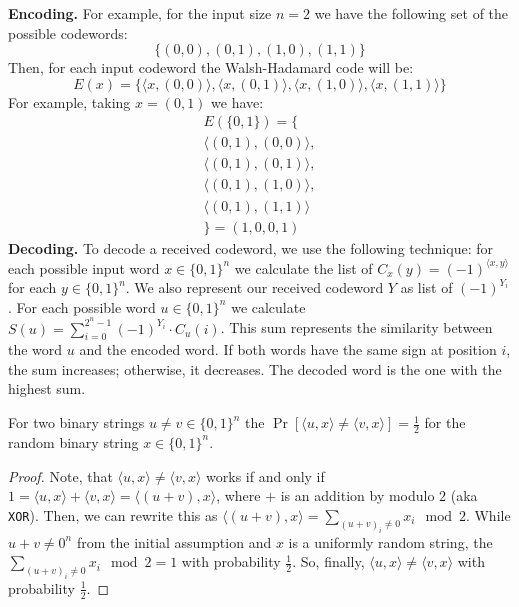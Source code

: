 \documentclass[../lecture-notes.tex]{subfiles}
\begin{document}
\begin{example}
\textbf{Encoding.} For example, for the input size $n = 2$ we have the following set of the possible codewords:
\begin{equation*}
    \{(0, 0), (0, 1), (1, 0), (1, 1)\}
\end{equation*}
Then, for each input codeword the Walsh-Hadamard code will be:
\begin{equation*}
    E(x) = \{\langle x, (0, 0) \rangle, \langle x, (0, 1) \rangle, \langle x, (1, 0) \rangle, \langle x,  (1, 1) \rangle\}
\end{equation*}
For example, taking $x = (0, 1)$ we have:
\begin{gather*}
    E(\{0, 1\}) = \{\\
    \langle (0, 1), (0, 0) \rangle,\\
    \langle (0, 1), (0, 1) \rangle,\\
    \langle (0, 1), (1, 0) \rangle,\\
    \langle (0, 1), (1, 1) \rangle\\
    \}=(1, 0, 0, 1)
\end{gather*}
\textbf{Decoding.} To decode a received codeword, we use the following technique: for each possible input word 
$x \in \{0, 1\}^n$ we calculate the list of $C_x(y) = (-1)^{\langle x, y \rangle}$ for each $y \in \{0, 1\}^n$. We 
also represent our received codeword $Y$ as list of $(-1)^{Y_i}$. For each possible word $u \in \{0, 1\}^n$ we 
calculate $S(u) = \sum_{i=0}^{2^n - 1} (-1)^{Y_i} \cdot C_u(i)$. This sum represents the similarity between the word 
$u$ and the encoded word. If both words have the same sign at position  $i$, the sum increases; otherwise, it 
decreases. The decoded word is the one with the highest sum.
\end{example}
\begin{lemma}
For two binary strings $u \neq v \in \{0, 1\}^n$ the $\Pr[\langle u, x \rangle \neq \langle v, x \rangle] = \frac{1}{2}$
 for the random binary string $x \in \{0, 1\}^n$.
\end{lemma}
\begin{proof}
Note, that $\langle u, x \rangle \neq \langle v, x \rangle$ works if and only if 
$1 = \langle u, x \rangle + \langle v, x \rangle = \langle (u + v), x \rangle$, where $+$ is an addition by modulo 
$2$ (aka \verb|XOR|). Then, we can rewrite this as $\langle (u + v), x \rangle = \sum_{(u + v)_i \neq 0} x_i \mod 2$. 
While $u + v \neq 0^n$ from the initial assumption and $x$ is a uniformly random string, the 
$\sum_{(u + v)_i \neq 0} x_i \mod 2 = 1$ with probability $\frac{1}{2}$. So, finally, 
$\langle u, x \rangle \neq \langle v, x \rangle$ with probability $\frac{1}{2}$.
\end{proof}
\end{document}
